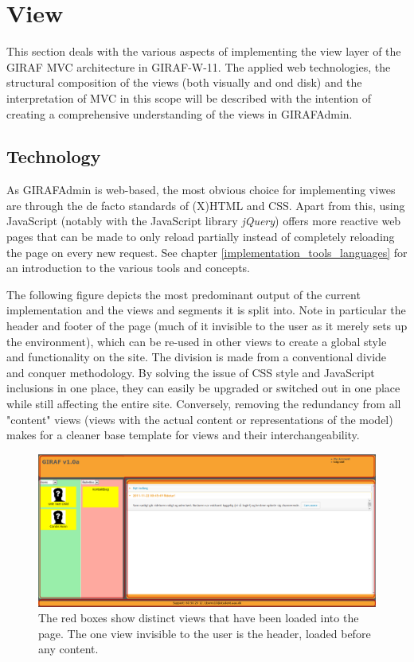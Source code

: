 \section{View}
\label{view}
This section deals with the various aspects of implementing the view layer of the GIRAF MVC architecture in GIRAF-W-11. The applied web technologies, the structural composition of the views (both visually and ond disk) and the interpretation of MVC in this scope will be described with the intention of creating a comprehensive understanding of the views in GIRAFAdmin.

\subsection{Technology}
As GIRAFAdmin is web-based, the most obvious choice for implementing viwes are through the de facto standards of (X)HTML and CSS. Apart from this, using JavaScript (notably with the JavaScript library \emph{jQuery}) offers more reactive web pages that can be made to only reload partially instead of completely reloading the page on every new request. See chapter \vref{implementation_tools_languages} for an introduction to the various tools and concepts.

The following figure depicts the most predominant output of the current implementation and the views and segments it is split into. Note in particular the header and footer of the page (much of it invisible to the user as it merely sets up the environment), which can be re-used in other views to create a global style and functionality on the site. The division is made from a conventional divide and conquer methodology. By solving the issue of CSS style and JavaScript inclusions in one place, they can easily be upgraded or switched out in one place while still affecting the entire site. Conversely, removing the redundancy from all "content" views (views with the actual content or representations of the model) makes for a cleaner base template for views and their interchangeability.

\begin{figure}
    \begin{center}
    \includegraphics[scale=0.45,angle=90]{img/mvc_details/mvc_detailed_views}
    \caption{\label{implementation_view_views1}The red boxes show distinct views that have been loaded into the page. The one view invisible to the user is the header, loaded before any content.}
    \end{center}
\end{figure}

